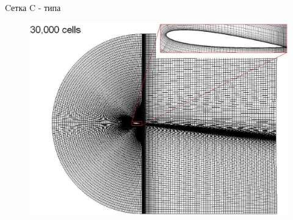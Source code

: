 \documentclass[10pt,xcolor=pst,aspectratio=169]{beamer}
\begin{document}
\begin{frame}{Cетка C - типа}

	\transdissolve[duration=0.1]
	\justifying
	\large

	\begin{figure}
		\includegraphics[width=0.6\linewidth]{C_type_grid_example.eps}
	\end{figure}

\end{frame}
\end{document}
